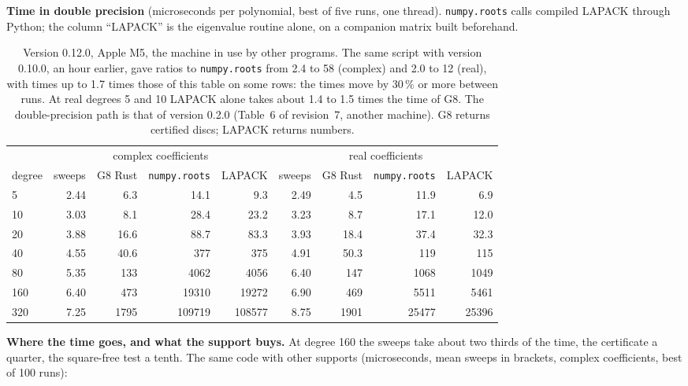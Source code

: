 \documentclass[10pt,a4paper]{article}
\theoremstyle{definition}
\numberwithin{equation}{section}
\begin{document}
\textbf{Time in double precision} (microseconds per polynomial, best of five runs, one thread).
\texttt{numpy.roots} calls compiled LAPACK through Python; the column ``LAPACK'' is the eigenvalue
routine alone, on a companion matrix built beforehand.
\begin{table}[H]\centering\small\setlength{\tabcolsep}{4.5pt}
\begin{tabular}{lrrrr@{\qquad}rrrr}
\toprule
 & \multicolumn{4}{c}{complex coefficients} & \multicolumn{4}{c}{real coefficients}\\
degree & sweeps & G8 Rust & \texttt{numpy.roots} & LAPACK & sweeps & G8 Rust & \texttt{numpy.roots} & LAPACK\\
\midrule
5 & 2.44 & 6.3 & 14.1 & 9.3 & 2.49 & 4.5 & 11.9 & 6.9\\
10 & 3.03 & 8.1 & 28.4 & 23.2 & 3.23 & 8.7 & 17.1 & 12.0\\
20 & 3.88 & 16.6 & 88.7 & 83.3 & 3.93 & 18.4 & 37.4 & 32.3\\
40 & 4.55 & 40.6 & 377 & 375 & 4.91 & 50.3 & 119 & 115\\
80 & 5.35 & 133 & 4062 & 4056 & 6.40 & 147 & 1068 & 1049\\
160 & 6.40 & 473 & 19310 & 19272 & 6.90 & 469 & 5511 & 5461\\
320 & 7.25 & 1795 & 109719 & 108577 & 8.75 & 1901 & 25477 & 25396\\
\bottomrule
\end{tabular}
\caption{Version 0.12.0, Apple M5, the machine in use by other programs. The same script with version
0.10.0, an hour earlier, gave ratios to \texttt{numpy.roots} from 2.4 to 58 (complex) and 2.0 to 12
(real), with times up to 1.7 times those of this table on some rows: the times move by 30\,\% or more
between runs. At real degrees 5 and 10 LAPACK alone takes about 1.4 to 1.5 times the time of G8.
The double-precision path is that of version 0.2.0 (Table~6 of revision~7, another machine).
G8 returns certified discs; LAPACK returns numbers.}\label{tab:time}
\end{table}
\textbf{Where the time goes, and what the support buys.} At degree 160 the sweeps take about two thirds
of the time, the certificate a quarter, the square-free test a tenth. The same code with other supports
(microseconds, mean sweeps in brackets, complex coefficients, best of 100 runs):
\end{document}
